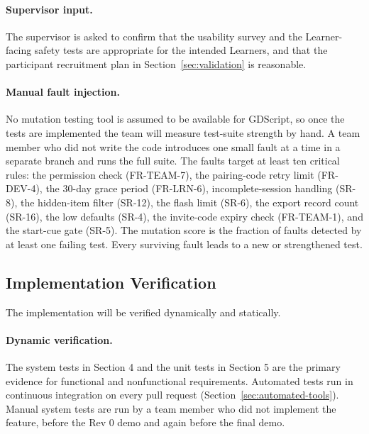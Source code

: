 \documentclass[12pt, titlepage]{article}
\newcommand{\srsref}[1]{#1}
\newcounter{validation}
\begin{document}
\paragraph{Supervisor input.} The supervisor is asked to confirm that the
usability survey and the Learner-facing safety tests are appropriate for the
intended Learners, and that the participant recruitment plan in
Section~\ref{sec:validation} is reasonable.

\paragraph{Manual fault injection.} No mutation testing tool is assumed to be
available for GDScript, so once the tests are implemented the team will measure
test-suite strength by hand. A team member who did not write the code
introduces one small fault at a time in a separate branch and runs the full
suite. The faults target at least ten critical rules: the permission check
(\srsref{FR-TEAM-7}), the pairing-code retry limit (\srsref{FR-DEV-4}), the 30-day grace period
(\srsref{FR-LRN-6}), incomplete-session handling (\srsref{SR-8}), the hidden-item filter (\srsref{SR-12}),
the flash limit (\srsref{SR-6}), the export record count (\srsref{SR-16}), the low defaults
(\srsref{SR-4}), the invite-code expiry check (\srsref{FR-TEAM-1}), and the start-cue gate
(\srsref{SR-5}). The mutation score is the fraction of faults detected by at least one
failing test. Every surviving fault leads to a new or strengthened test.

\subsection{Implementation Verification}

\label{sec:impl-ver}

The implementation will be verified dynamically and statically.

\paragraph{Dynamic verification.} The system tests in Section 4 and the unit
tests in Section 5 are the primary evidence for functional and nonfunctional
requirements. Automated tests run in continuous integration on every pull
request (Section~\ref{sec:automated-tools}). Manual system tests are run by a team member
who did not implement the feature, before the Rev 0 demo and again before the
final demo.
\end{document}
